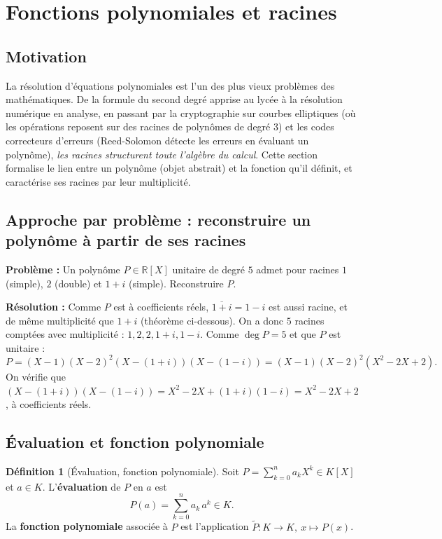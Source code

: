 \documentclass[12pt,a4paper]{report}
\theoremstyle{definition}
\newtheorem{definition}{Définition}[section]
\theoremstyle{remark}
\begin{document}
\section{Fonctions polynomiales et racines}

\subsection{Motivation}
La résolution d'équations polynomiales est l'un des plus vieux problèmes des mathématiques. De la formule du second degré apprise au lycée à la résolution numérique en analyse, en passant par la cryptographie sur courbes elliptiques (où les opérations reposent sur des racines de polynômes de degré 3) et les codes correcteurs d'erreurs (Reed-Solomon détecte les erreurs en évaluant un polynôme), \emph{les racines structurent toute l'algèbre du calcul}. Cette section formalise le lien entre un polynôme (objet abstrait) et la fonction qu'il définit, et caractérise ses racines par leur multiplicité.

\subsection{Approche par problème : reconstruire un polynôme à partir de ses racines}
\textbf{Problème :} Un polynôme $P \in \mathbb{R}[X]$ unitaire de degré $5$ admet pour racines $1$ (simple), $2$ (double) et $1 + i$ (simple). Reconstruire $P$.

\textbf{Résolution :} Comme $P$ est à coefficients réels, $\overline{1 + i} = 1 - i$ est aussi racine, et de même multiplicité que $1 + i$ (théorème ci-dessous). On a donc $5$ racines comptées avec multiplicité : $1, 2, 2, 1+i, 1-i$. Comme $\deg P = 5$ et que $P$ est unitaire :
\[ P = (X - 1)(X - 2)^2 (X - (1+i))(X - (1-i)) = (X - 1)(X - 2)^2 (X^2 - 2X + 2). \]
On vérifie que $(X - (1+i))(X - (1-i)) = X^2 - 2X + (1+i)(1-i) = X^2 - 2X + 2$, à coefficients réels. \checkmark

\subsection{Évaluation et fonction polynomiale}

\begin{definition}[Évaluation, fonction polynomiale]
Soit $P = \sum_{k=0}^{n} a_k X^k \in K[X]$ et $a \in K$. L'\textbf{évaluation} de $P$ en $a$ est
\[ P(a) = \sum_{k=0}^{n} a_k\, a^k \in K. \]
La \textbf{fonction polynomiale} associée à $P$ est l'application $\widetilde{P} : K \to K,\ x \mapsto P(x)$.
\end{definition}
\end{document}
